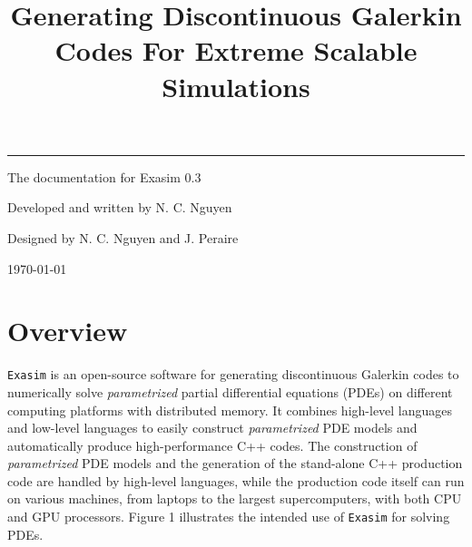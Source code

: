 \documentclass[11pt]{article}
\date{}
\begin{document}
    
        \title{\huge Generating Discontinuous Galerkin Codes For Extreme Scalable Simulations}
        
    \maketitle

 \rule{16.4cm}{0.25cm} 

\hspace{8cm} {\large The documentation for Exasim 0.3}

\hspace{8cm}    {\large Developed and written by N. C. Nguyen}

\hspace{8cm}   {\large Designed by N. C. Nguyen and J. Peraire}
        
\hspace{8cm} {\large \today}
    
\vspace{6cm}

    
    \newpage
    
\section{Overview}

\texttt{Exasim} is an open-source software for generating discontinuous Galerkin codes to numerically solve {\em parametrized} partial differential equations (PDEs) on different computing platforms with distributed memory.  It combines high-level languages  and low-level languages to easily construct {\em parametrized} PDE models and automatically produce high-performance C++ codes. The construction of {\em parametrized} PDE models and the generation of the stand-alone C++ production code are handled by high-level languages, while the production code itself can run on various machines, from laptops to the largest supercomputers, with both CPU and GPU processors. Figure 1 illustrates  the intended use of \texttt{Exasim} for solving PDEs.

\end{document}
